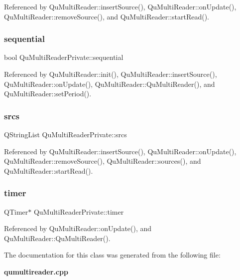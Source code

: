 Referenced by Qu\+Multi\+Reader\+::insert\+Source(), Qu\+Multi\+Reader\+::on\+Update(), Qu\+Multi\+Reader\+::remove\+Source(), and Qu\+Multi\+Reader\+::start\+Read().

\mbox{\label{classQuMultiReaderPrivate_ad443e86b41c6bfe2a3c122b0fd5af6a3}} 
\subsubsection{sequential}
{\footnotesize\ttfamily bool Qu\+Multi\+Reader\+Private\+::sequential}



Referenced by Qu\+Multi\+Reader\+::init(), Qu\+Multi\+Reader\+::insert\+Source(), Qu\+Multi\+Reader\+::on\+Update(), Qu\+Multi\+Reader\+::\+Qu\+Multi\+Reader(), and Qu\+Multi\+Reader\+::set\+Period().

\mbox{\label{classQuMultiReaderPrivate_a12181f870db58ec5baa45fd7da146c80}} 
\subsubsection{srcs}
{\footnotesize\ttfamily Q\+String\+List Qu\+Multi\+Reader\+Private\+::srcs}



Referenced by Qu\+Multi\+Reader\+::insert\+Source(), Qu\+Multi\+Reader\+::on\+Update(), Qu\+Multi\+Reader\+::remove\+Source(), Qu\+Multi\+Reader\+::sources(), and Qu\+Multi\+Reader\+::start\+Read().

\mbox{\label{classQuMultiReaderPrivate_ad62ad176d3edd33e64b259568523a470}} 
\subsubsection{timer}
{\footnotesize\ttfamily Q\+Timer$\ast$ Qu\+Multi\+Reader\+Private\+::timer}



Referenced by Qu\+Multi\+Reader\+::on\+Update(), and Qu\+Multi\+Reader\+::\+Qu\+Multi\+Reader().



The documentation for this class was generated from the following file\+:\begin{DoxyCompactItemize}
\item 
\textbf{ qumultireader.\+cpp}\end{DoxyCompactItemize}

